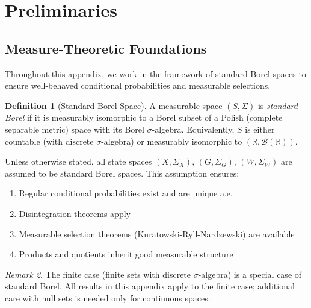 \documentclass[11pt,a4paper]{article}
\theoremstyle{definition}
\newtheorem{definition}{Definition}[section]
\theoremstyle{plain}
\theoremstyle{remark}
\newtheorem{remark}[definition]{Remark}
\newcommand{\Real}{\mathbb{R}}
\begin{document}
\newpage

\section{Preliminaries}

\subsection{Measure-Theoretic Foundations}

Throughout this appendix, we work in the framework of standard Borel spaces to ensure well-behaved conditional probabilities and measurable selections.

\begin{definition}[Standard Borel Space]
A measurable space $(S, \Sigma)$ is \emph{standard Borel} if it is measurably isomorphic to a Borel subset of a Polish (complete separable metric) space with its Borel $\sigma$-algebra. Equivalently, $S$ is either countable (with discrete $\sigma$-algebra) or measurably isomorphic to $(\Real, \mathcal{B}(\Real))$.
\end{definition}

\begin{assumption}\label{ass:measurability}
Unless otherwise stated, all state spaces $(X, \Sigma_X)$, $(G, \Sigma_G)$, $(W, \Sigma_W)$ are assumed to be standard Borel spaces. This assumption ensures:
\begin{enumerate}[label=(\roman*)]
    \item Regular conditional probabilities exist and are unique a.e.
    \item Disintegration theorems apply
    \item Measurable selection theorems (Kuratowski-Ryll-Nardzewski) are available
    \item Products and quotients inherit good measurable structure
\end{enumerate}
\end{assumption}

\begin{remark}
The finite case (finite sets with discrete $\sigma$-algebra) is a special case of standard Borel. All results in this appendix apply to the finite case; additional care with null sets is needed only for continuous spaces.
\end{remark}
\end{document}

